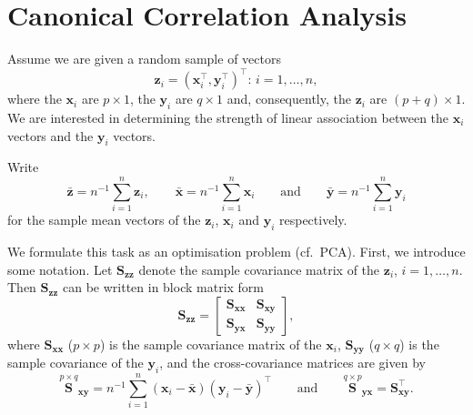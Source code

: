 \documentclass[]{book}
\theoremstyle{definition}
\theoremstyle{definition}
\theoremstyle{definition}
\theoremstyle{remark}
\begin{document}
\hypertarget{canonical-correlation-analysis}{%
\section{Canonical Correlation Analysis}\label{canonical-correlation-analysis}}

Assume we are given a random sample of vectors
\[
\boldsymbol z_i=(\boldsymbol x_i^\top , \boldsymbol y_i^\top )^\top: \, i=1,\ldots, n,
\]
where
the \(\boldsymbol x_i\) are \(p \times 1\), the \(\boldsymbol y_i\) are \(q \times 1\) and, consequently, the \(\boldsymbol z_i\) are \((p+q)\times 1\). We are interested in determining the strength of linear association between the \(\boldsymbol x_i\) vectors and the \(\boldsymbol y_i\) vectors.

Write
\[
\bar{\boldsymbol z}=n^{-1}\sum_{i=1}^n \boldsymbol z_i, \qquad \bar{\boldsymbol x}=n^{-1} \sum_{i=1}^n \boldsymbol x_i \qquad \text{and} \qquad \bar{\boldsymbol y}=n^{-1}\sum_{i=1}^n \boldsymbol y_i
\]
for the sample mean vectors of the \(\boldsymbol z_i\), \(\boldsymbol x_i\) and \(\boldsymbol y_i\) respectively.

We formulate this task as an optimisation problem (cf.~PCA). First, we introduce some notation. Let \(\boldsymbol S_{\boldsymbol z\boldsymbol z}\) denote the sample covariance matrix of the \(\boldsymbol z_i\), \(i=1,\ldots, n\). Then \(\boldsymbol S_{\boldsymbol z\boldsymbol z}\) can be written in block matrix form
\[
\boldsymbol S_{\boldsymbol z\boldsymbol z}=\left [\begin{array}{cc}
\boldsymbol S_{\boldsymbol x\boldsymbol x} & \boldsymbol S_{\boldsymbol x\boldsymbol y}\\
\boldsymbol S_{\boldsymbol y\boldsymbol x} & \boldsymbol S_{\boldsymbol y\boldsymbol y} \end{array} \right ],
\]
where \(\boldsymbol S_{\boldsymbol x\boldsymbol x}\) (\(p \times p\)) is the sample covariance matrix of the \(\boldsymbol x_i\), \(\boldsymbol S_{\boldsymbol y\boldsymbol y}\) (\(q \times q\)) is the sample covariance of the \(\boldsymbol y_i\), and the cross-covariance matrices are given by
\[
\stackrel{p \times q}{\boldsymbol S}_{\boldsymbol x\boldsymbol y}=n^{-1} \sum_{i=1}^n (\boldsymbol x_i -\bar{\boldsymbol x})(\boldsymbol y_i-\bar{\boldsymbol y})^\top
\qquad \text{and} \qquad \stackrel{q \times p}{\boldsymbol S}_{\boldsymbol y\boldsymbol x}=\boldsymbol S_{\boldsymbol x\boldsymbol y}^\top.
\]
\end{document}

